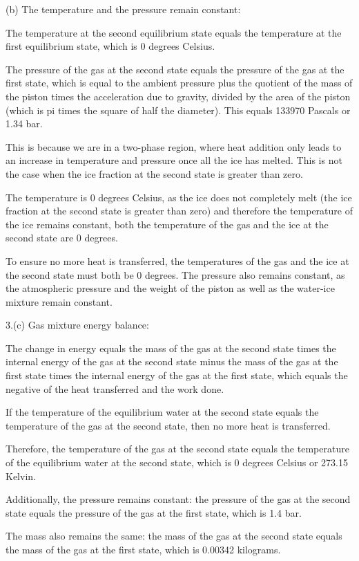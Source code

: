 (b) The temperature and the pressure remain constant:

The temperature at the second equilibrium state equals the temperature at the first equilibrium state, which is 0 degrees Celsius.

The pressure of the gas at the second state equals the pressure of the gas at the first state, which is equal to the ambient pressure plus the quotient of the mass of the piston times the acceleration due to gravity, divided by the area of the piston (which is pi times the square of half the diameter). This equals 133970 Pascals or 1.34 bar.

This is because we are in a two-phase region, where heat addition only leads to an increase in temperature and pressure once all the ice has melted. This is not the case when the ice fraction at the second state is greater than zero.

The temperature is 0 degrees Celsius, as the ice does not completely melt (the ice fraction at the second state is greater than zero) and therefore the temperature of the ice remains constant, both the temperature of the gas and the ice at the second state are 0 degrees.

To ensure no more heat is transferred, the temperatures of the gas and the ice at the second state must both be 0 degrees. The pressure also remains constant, as the atmospheric pressure and the weight of the piston as well as the water-ice mixture remain constant.

3.(c) Gas mixture energy balance:

The change in energy equals the mass of the gas at the second state times the internal energy of the gas at the second state minus the mass of the gas at the first state times the internal energy of the gas at the first state, which equals the negative of the heat transferred and the work done.

If the temperature of the equilibrium water at the second state equals the temperature of the gas at the second state, then no more heat is transferred.

Therefore, the temperature of the gas at the second state equals the temperature of the equilibrium water at the second state, which is 0 degrees Celsius or 273.15 Kelvin.

Additionally, the pressure remains constant: the pressure of the gas at the second state equals the pressure of the gas at the first state, which is 1.4 bar.

The mass also remains the same: the mass of the gas at the second state equals the mass of the gas at the first state, which is 0.00342 kilograms.

